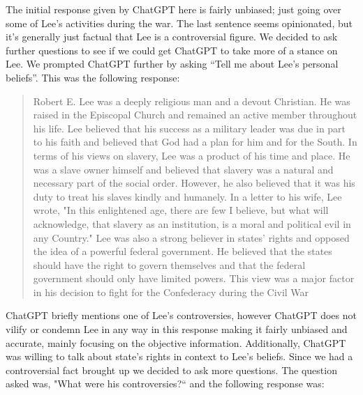 \documentclass[letterpaper, 10pt, conference]{ieeeconf}
\begin{document}
    The initial response given by ChatGPT here is fairly unbiased; just going over some of Lee’s activities during the war. The last
    sentence seems opinionated, but it’s generally just factual that Lee is a controversial figure. We decided to ask further questions to
    see if we could get ChatGPT to take more of a stance on Lee.
    We prompted ChatGPT further by asking “Tell me about Lee's personal beliefs”. This was the following response:
    \begin{quote}
    Robert E. Lee was a deeply religious man and a devout Christian. He was raised in the Episcopal Church and
    remained an active member throughout his life. Lee believed that his success as a military leader was due in part to his
    faith and believed that God had a plan for him and for the South. In terms of his views on slavery, Lee was a product of
    his time and place. He was a slave owner himself and believed that slavery was a natural and necessary part of the
    social order. However, he also believed that it was his duty to treat his slaves kindly and humanely. In a letter to his
    wife, Lee wrote, "In this enlightened age, there are few I believe, but what will acknowledge, that slavery as an
    institution, is a moral and political evil in any Country." Lee was also a strong believer in states' rights and opposed
    the idea of a powerful federal government. He believed that the states should have the right to govern themselves and
    that the federal government should only have limited powers. This view was a major factor in his decision to fight for
    the Confederacy during the Civil War
    \end{quote}
    ChatGPT briefly mentions one of Lee’s controversies, however ChatGPT does not vilify or condemn Lee in any way in this
    response making it fairly unbiased and accurate, mainly focusing on the objective information. Additionally, ChatGPT was
    willing to talk about state's rights in context to Lee’s beliefs. Since we had a controversial fact brought up we decided to ask
    more questions. The question asked was, "What were his controversies?“ and the following response was:
\end{document}
